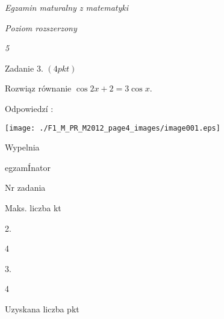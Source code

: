 \documentclass[a4paper,12pt]{article}
\begin{document}
{\it Egzamin maturalny z matematyki}

{\it Poziom rozszerzony}

{\it 5}

Zadanie 3. $(4pkt)$

Rozwiąz równanie $\cos 2x+2=3\cos x.$

Odpowiedzí :
\begin{center}
\texttt{[image: ./F1\_M\_PR\_M2012\_page4\_images/image001.eps]}
\end{center}
Wypelnia

egzamÍnator

Nr zadania

Maks. liczba kt

2.

4

3.

4

Uzyskana liczba pkt
\end{document}
